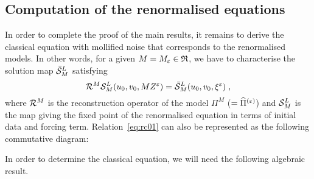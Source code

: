 \documentclass[reqno,11pt]{article}
\begin{document}

\subsection{Computation of the renormalised equations}
\label{ssec_renorm_compute}

In order to complete the proof of the main results, it remains to derive the
classical equation with mollified noise that corresponds to the renormalised
models. In other words, for a given $M=M_\varepsilon\in\mathfrak{R}$, we have to
characterise the solution map $\bar{{\mathcal S}}^L_M$ satisfying 
\begin{equation}
\label{eq:rc01} 
 \cR^M \cS^L_M(u_0,v_0,MZ^\eps) = \bar\cS^L_M(u_0,v_0,\xi^\eps)\;,
\end{equation}
where ${\mathcal R}^M$ is the reconstruction operator of the model
$\Pi^M$ ($=\widehat\Pi^{(\varepsilon)}$) and ${\mathcal S}^L_M$ is the map giving the fixed
point of the renormalised equation in terms of initial data and forcing term.
Relation~\eqref{eq:rc01} can also be represented as the following commutative
diagram:

\begin{center}
\end{center}

In order to determine the classical equation, we will need the following
algebraic result.
\end{document}
